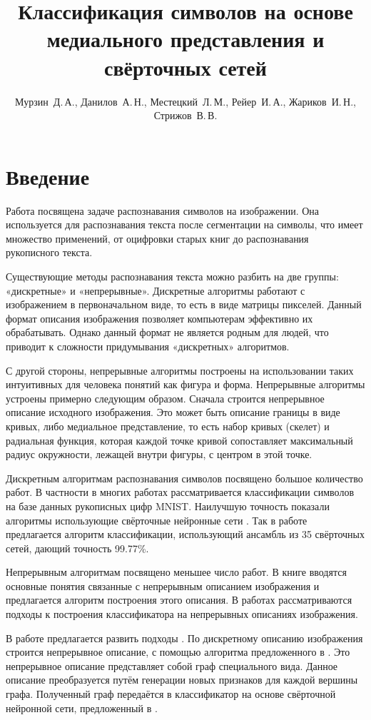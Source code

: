 \documentclass[12pt,twoside]{article}
\title
    {Классификация символов на основе медиального представления и свёрточных сетей}
\author
    {Мурзин~Д.\,А., Данилов~А.\,Н., Местецкий~Л.\,М., Рейер~И.\,А., Жариков~И.\,Н., Стрижов~В.\,В.}
\begin{document}
\maketitle
\section{Введение}
Работа посвящена задаче распознавания символов на изображении. Она используется для распознавания текста после сегментации на символы, что имеет множество применений, от оцифровки старых книг до распознавания рукописного текста.

Существующие методы распознавания текста можно разбить на две группы: «дискретные» и «непрерывные». Дискретные алгоритмы работают с изображением в первоначальном виде, то есть в виде матрицы пикселей. Данный формат описания изображения позволяет компьютерам эффективно их обрабатывать. Однако данный формат не является родным для людей, что приводит к сложности придумывания «дискретных» алгоритмов.

С другой стороны, непрерывные алгоритмы построены на использовании таких интуитивных для человека понятий как фигура и форма. Непрерывные алгоритмы устроены примерно следующим образом. Сначала строится непрерывное описание исходного изображения. Это может быть описание границы в виде кривых, либо медиальное представление, то есть набор кривых (скелет) и радиальная функция, которая каждой точке кривой сопоставляет максимальный радиус окружности, лежащей внутри фигуры, с центром в этой точке.

Дискретным алгоритмам распознавания символов посвящено большое количество работ. В частности в многих работах рассматривается классификации символов на базе данных рукописных цифр MNIST. Наилучшую точность показали алгоритмы использующие свёрточные нейронные сети \cite{previous_work_mnist21,previous_work_mnist23,previous_work_mnist23-2,previous_work_mnist24}. Так в работе \cite{previous_work_mnist23} предлагается алгоритм классификации, использующий ансамбль из 35 свёрточных сетей, дающий точность 99.77\%.

Непрерывным алгоритмам посвящено меньшее число работ. В книге \cite{mest2009} вводятся основные понятия связанные с непрерывным описанием изображения и предлагается алгоритм построения этого описания. В работах \cite{han2016, vizilter2018, morozov2017} рассматриваются подходы к построения классификатора на непрерывных описаниях изображения.

В работе предлагается развить подходы \cite{mest2009, han2016}. По дискретному описанию изображения строится непрерывное описание, с помощью алгоритма предложенного в \cite{mest2009}. Это непрерывное описание представляет собой граф специального вида. Данное описание преобразуется путём генерации новых признаков для каждой вершины графа. Полученный граф передаётся в классификатор на основе свёрточной нейронной сети, предложенный в \cite{han2016}.
\end{document}
